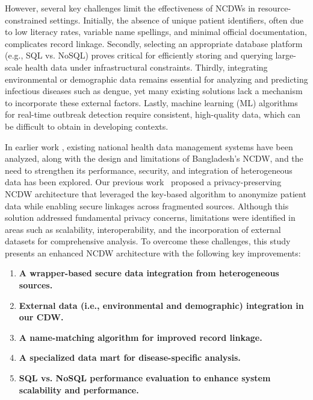 However, several key challenges limit the effectiveness of NCDWs in resource-constrained settings. Initially, the absence of unique patient identifiers, often due to low literacy rates, variable name spellings, and minimal official documentation, complicates record linkage. Secondly, selecting an appropriate database platform (e.g., SQL vs. NoSQL) proves critical for efficiently storing and querying large-scale health data under infrastructural constraints. Thirdly, integrating environmental or demographic data remains essential for analyzing and predicting infectious diseases such as dengue, yet many existing solutions lack a mechanism to incorporate these external factors. Lastly, machine learning (ML) algorithms for real-time outbreak detection require consistent, high-quality data, which can be difficult to obtain in developing contexts.


In earlier work \cite{ncdwProblemsIssues}, existing national health data management systems have been analyzed, along with the design and limitations of Bangladesh’s NCDW, and the need to strengthen its performance, security, and integration of heterogeneous data has been explored. Our previous work~\cite{mia2022privacy,ksrl} proposed a privacy-preserving NCDW architecture that leveraged the key-based algorithm to anonymize patient data while enabling secure linkages across fragmented sources. Although this solution addressed fundamental privacy concerns, limitations were identified in areas such as scalability, interoperability, and the incorporation of external datasets for comprehensive analysis. To overcome these challenges, this study presents an enhanced NCDW architecture with the following key improvements:
\begin{enumerate}
    \item \textbf{A wrapper-based secure data integration from heterogeneous sources.}
    \item \textbf{ External data (i.e., environmental and demographic)  integration in our CDW.}
    \item \textbf{A name-matching algorithm for improved record linkage.}
    \item \textbf{A specialized data mart for disease-specific analysis.}
    \item \textbf{SQL vs. NoSQL performance evaluation to enhance system scalability and performance.}
\end{enumerate}

